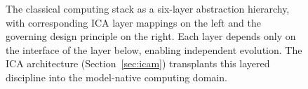 \begin{figure}[htbp]
{}%
\caption{The classical computing stack as a six-layer abstraction hierarchy, with corresponding ICA layer mappings on the left and the governing design principle on the right. Each layer depends only on the interface of the layer below, enabling independent evolution. The ICA architecture (Section~\ref{sec:icam}) transplants this layered discipline into the model-native computing domain.}
\label{fig:classical_stack}
\end{figure}
